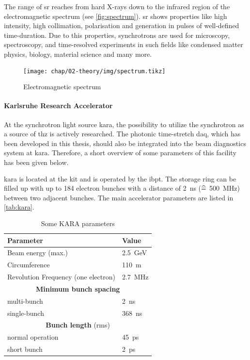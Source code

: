 The range of \gls{sr} reaches from hard X-rays down to the infrared region of the electromagnetic spectrum (see \autoref{fig:spectrum}). \Gls{sr} shows properties like high intensity, high collimation, polarisation and generation in pulses of well-defined time-duration.
Due to this properties, synchrotrons are used for microscopy, spectroscopy, and time-resolved experiments in such fields like condensed matter physics, biology, material science and many more.
\begin{figure}[H]
	\centering
	\texttt{[image: chap/02-theory/img/spectrum.tikz]}
	\caption{Electromagnetic spectrum} %
	\label{fig:spectrum}
\end{figure}


\paragraph{Karlsruhe Research Accelerator}
At the synchrotron light source \gls{kara}, the possibility to utilize the synchrotron as a source of \gls{thz} is actively researched. 
The photonic time-stretch \gls{daq}, which has been developed in this thesis, should also be integrated into the beam diagnostics system at \gls{kara}. 
Therefore, a short overview of some parameters of this facility has been given below.

\gls{kara} is located at the \gls{kit} and is operated by the \gls{ibpt}.
The storage ring can be filled up with up to 184 electron bunches with a distance of \SI{2}{\nano\second} ($\mathrel{\widehat{=}}$ \SI{500}{\mega\hertz}) between two adjacent bunches.
The main accelerator parameters are listed in \autoref{tab:kara}. 

\begin{table}[tbh]
	\caption{Some KARA parameters \cite{rota2018}}
	\label{tab:kara}
	\centering
	\begin{tabular}{ll}
		\toprule
		\textbf{Parameter}                  & \textbf{Value}                \\ \midrule
		Beam energy (max.)                  & \SI{2.5}{\giga \electronvolt} \\
		Circumference                       & \SI{110}{\meter}              \\
		Revolution Frequency (one electron) & \SI{2.7}{\mega \hertz}        \\
		        \multicolumn{2}{c}{\textbf{Minimum bunch spacing}}          \\
		\quad multi-bunch                   & \SI{2}{\nano \second}         \\
		\quad single-bunch                  & \SI{368}{\nano \second}       \\
		          \multicolumn{2}{c}{\textbf{Bunch length} (rms)}           \\
		\quad normal operation              & \SI{45}{\pico \second}        \\
		\quad short bunch                   & \SI{2}{\pico \second}         \\ \bottomrule
	\end{tabular}
\end{table}

